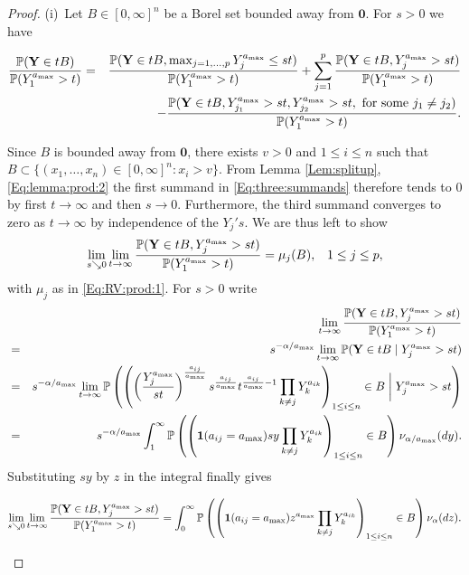 \begin{proof}%
(i)~Let $B \in [0,\infty]^n$ be a Borel set bounded away from $\mathbf{0}$. For $s>0$ we have
\begin{small}
\begin{eqnarray}
  \label{Eq:three:summands}  \frac{\P(\mathbf{Y} \in tB)}{\P(Y_1^{a_{\max}}>t)} &=&  \frac{\P(\mathbf{Y} \in tB, \max_{j=1, \ldots, p}Y_j^{a_{\max}}\leq st)}{\P(Y_1^{a_{\max}}>t)}
  + \sum_{j=1}^p  \frac{\P(\mathbf{Y} \in tB, Y_j^{a_{\max}}>st)}{\P(Y_1^{a_{\max}}>t)} \nonumber\\
  && - \frac{\P(\mathbf{Y} \in tB, Y_{j_1}^{a_{\max}}>st, Y_{j_2}^{a_{\max}}>st, \mbox{ for some } j_1 \neq j_2)}{\P(Y_1^{a_{\max}}>t)}.
\end{eqnarray}
\end{small}
Since $B$ is bounded away from $\mathbf{0}$, there exists $v>0$ and $1 \leq i \leq n$ such that $B \subset \{(x_1, \ldots, x_n) \in [0,\infty]^n: x_i>v\}$. From Lemma \ref{Lem:splitup}, \eqref{Eq:lemma:prod:2} the first summand in \eqref{Eq:three:summands} therefore tends to 0 by first $t \to \infty$ and then $s \to 0$. Furthermore, the third summand converges to zero as $t \to \infty$ by independence of the $Y_j's$. We are thus left to show
$$ \lim_{s \searrow 0}\lim_{t \to \infty} \frac{\P(\mathbf{Y} \in tB, Y_j^{a_{\max}}>st)}{\P(Y_1^{a_{\max}}>t)}=\mu_j(B), \;\;\; 1 \leq j \leq p, $$
with $\mu_j$ as in \eqref{Eq:RV:prod:1}. For $s>0$ write
\begin{eqnarray*} && \lim_{t \to \infty}\frac{\P(\mathbf{Y} \in tB, Y_j^{a_{\max}}>st)}{\P(Y_1^{a_{\max}}>t)}\\
&=& s^{-\alpha/{a_{\max}}} \lim_{t\to \infty} \P(\mathbf{Y} \in tB \mid Y_j^{a_{\max}}>st) \\
&=& s^{-\alpha/{a_{\max}}} \lim_{t \to \infty} \P\left(\left(\left(\frac{Y_j^{a_{\max}}}{st}\right)^{\frac{a_{ij}}{a_{\max}}}s^{\frac{a_{ij}}{a_{\max}}}t^{\frac{a_{ij}}{a_{\max}}-1}\prod_{k\neq j} Y_k^{a_{ik}}\right)_{1\leq i \leq n} \in B \; \bigg| \; Y_j^{a_{\max}}>st \right)\\
&=& s^{-\alpha/{a_{\max}}} \int_1^\infty \P\left(\left(\I(a_{ij}=a_{\max})sy\prod_{k \neq j}Y_k^{a_{ik}}\right)_{1 \leq i \leq n} \in B\right)\nu_{\alpha/a_{\max}}(dy).
\end{eqnarray*}
Substituting $sy$ by $z$ in the integral finally gives
\begin{small}
$$ \lim_{s \searrow 0}\lim_{t \to \infty} \frac{\P(\mathbf{Y} \in tB, Y_j^{a_{\max}}>st)}{\P(Y_1^{a_{\max}}>t)}=\int_0^\infty \P\left(\left(\I(a_{ij}=a_{\max})z^{a_{\max}}\prod_{k \neq j}Y_k^{a_{ik}}\right)_{1 \leq i \leq n} \in B\right)\nu_{\alpha}(dz). $$

\end{small}
\end{proof}
